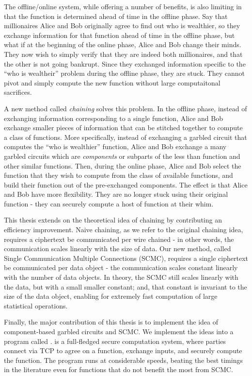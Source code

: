 The offline/online system, while offering a number of benefits, is also limiting in that the function is determined ahead of time in the offline phase.
Say that millionaires Alice and Bob originally agree to find out who is wealthier, so they exchange information for that function ahead of time in the offline phase, but what if at the beginning of the online phase, Alice and Bob change their minds. 
They now wish to simply verify that they are indeed both millionaires, and that the other is not going bankrupt.
Since they exchanged information specific to the ``who is wealtheir'' problem during the offline phase, they are stuck. 
They cannot pivot and simply compute the new function without large computaitonal sacrifices.

A new method called \textit{chaining} solves this problem.
In the offline phase, instead of exchanging information corresponding to a single function, Alice and Bob exchange smaller pieces of information that can be stitched together to compute a class of functions.
More specifically, instead of exchanging a garbled circuit that computes the ``who is wealthier'' function, Alice and Bob exchange a many garbled circuits which are \textit{components} or subparts of the less than function and other similar functions.
Then, during the online phase, Alice and Bob select the function that they wish to compute from the class of available functions, and build their function out of the pre-exchanged components.
The effect is that Alice and Bob have more flexibility. 
They are no longer stuck using their original function - they can securely compute a host of function at their whim. 

This thesis extends on the theoretical idea of chaining by contributing an efficiency improvement.
Naive chaining, as we refer to the original chaining idea, requires a ciphertext be communicated per wire chained - in other words, the communication scales linearly with the size of data.
Our new method, called Single Communication Multiple Connections (SCMC), requires a single ciphertext be communicated per data object - the communication scales constant linearly with the number of data objects.
In theory, the SCMC still scales linearly with the data, but with a small smaller constant; and, that constant is invariant to the size of the data object, enabling for extremely fast computation of large statistical operations.

Finally, the major contribution of this thesis is to implement the idea of component-based garbled circuits and SCMC.
We implement the ideas into a program called \CompGC.
\CompGC is a full-fledged secure computation system, where parties connect via TCP to agree on a function, exchange inputs, and securely compute the function.
The program runs at considerable speeds, beating the best timings in the literature even for functions that do not benefit the most from SCMC.


